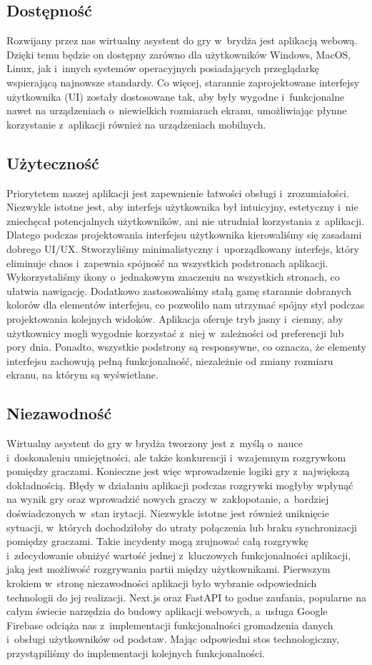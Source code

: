 \subsection{Dostępność}
Rozwijany przez nas wirtualny asystent do gry w~brydża jest aplikacją
webową. Dzięki temu będzie on dostępny zarówno dla użytkowników
Windows, MacOS, Linux, jak i~innych systemów operacyjnych posiadających
przeglądarkę wspierającą najnowsze standardy. Co więcej, starannie
zaprojektowane interfejsy użytkownika (UI) zostały dostosowane tak,
aby były wygodne i~funkcjonalne nawet na urządzeniach o~niewielkich
rozmiarach ekranu, umożliwiając płynne korzystanie z~aplikacji również
na urządzeniach mobilnych.
\subsection{Użyteczność}
Priorytetem naszej aplikacji jest zapewnienie łatwości obsługi
i~zrozumiałości. Niezwykle istotne jest, aby interfejs użytkownika
był intuicyjny, estetyczny i~nie zniechęcał potencjalnych użytkowników,
ani nie utrudniał korzystania z~aplikacji. Dlatego podczas projektowania
interfejsu użytkownika kierowaliśmy się zasadami dobrego UI/UX.
Stworzyliśmy minimalistyczny i~uporządkowany interfejs, który eliminuje
chaos i~zapewnia spójność na wszystkich podstronach aplikacji.
Wykorzystaliśmy ikony o~jednakowym znaczeniu na wszystkich stronach,
co ułatwia nawigację. Dodatkowo zastosowaliśmy stałą gamę starannie
dobranych kolorów dla elementów interfejsu, co pozwoliło nam utrzymać
spójny styl podczas projektowania kolejnych widoków. Aplikacja oferuje
tryb jasny i~ciemny, aby użytkownicy mogli wygodnie korzystać z~niej
w~zależności od preferencji lub pory dnia. Ponadto, wszystkie podstrony
są responsywne, co oznacza, że elementy interfejsu zachowują pełną
funkcjonalność, niezależnie od zmiany rozmiaru ekranu, na którym są
wyświetlane.
\subsection{Niezawodność}
Wirtualny asystent do gry w brydża tworzony jest z~myślą o~nauce
i~doskonaleniu umiejętności, ale także konkurencji i~wzajemnym
rozgrywkom pomiędzy graczami. Konieczne jest więc wprowadzenie logiki
gry z~największą dokładnością. Błędy w działaniu aplikacji podczas
rozgrywki mogłyby wpłynąć na wynik gry oraz wprowadzić nowych graczy
w~zakłopotanie, a~bardziej doświadczonych w~stan irytacji.
Niezwykle istotne jest również uniknięcie sytuacji, w~których
dochodziłoby do utraty połączenia lub braku synchronizacji pomiędzy
graczami. Takie incydenty mogą zrujnować całą rozgrywkę i~zdecydowanie
obniżyć wartość jednej z~kluczowych funkcjonalności aplikacji, jaką
jest możliwość rozgrywania partii między użytkownikami.
Pierwszym krokiem w~stronę niezawodności aplikacji było wybranie
odpowiednich technologii do jej realizacji. Next.js oraz FastAPI %
to godne zaufania, popularne na całym świecie narzędzia do budowy
aplikacji webowych, a~usługa Google Firebase odciąża nas z~implementacji
funkcjonalności gromadzenia danych i~obsługi użytkowników od podstaw.
Mając odpowiedni stos technologiczny, przystąpiliśmy do implementacji
kolejnych funkcjonalności.

